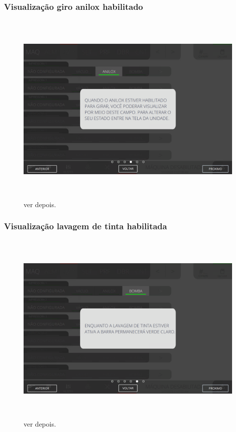 \newpage
\thispagestyle{fancy}
\vspace*{\fill}
\subsubsection{\small{Visualização giro anilox habilitado}}
\begin{figure}[h]
  \centering
  \includegraphics[width=576px,height=360px]{src/images/04-printter/01-printters/commands/e-4.png}
  \caption{ver depois.}
   \label{}
\end{figure}
\vspace*{\fill}

\newpage
\thispagestyle{fancy}
\vspace*{\fill}
\subsubsection{\small{Visualização lavagem de tinta habilitada}}
\begin{figure}[h]
  \centering
  \includegraphics[width=576px,height=360px]{src/images/04-printter/01-printters/commands/e-5.png}
  \caption{ver depois.}
   \label{}
\end{figure}
\vspace*{\fill}

